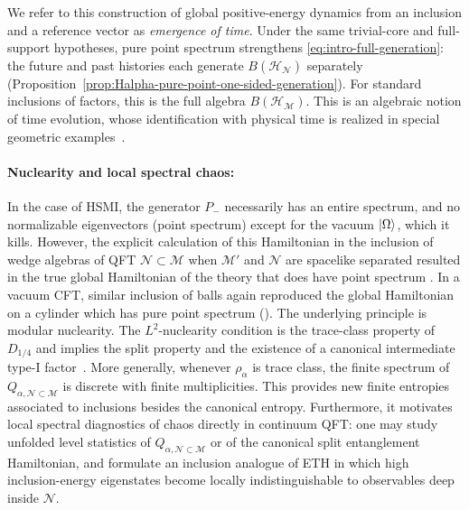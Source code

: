 \documentclass[a4paper,11pt]{article}
\theoremstyle{definition}
\newcommand{\mN}{\mathcal{N}}
\newcommand{\mH}{\mathcal{H}}
\newcommand{\mM}{\mathcal{M}}
\begin{document}
We refer to this construction of global positive-energy dynamics from an inclusion and a reference vector as \emph{emergence of time}. Under the same trivial-core and full-support hypotheses, pure point spectrum strengthens \eqref{eq:intro-full-generation}: the future and past histories each generate $B(\mH_{\mN})$ separately (Proposition~\ref{prop:Halpha-pure-point-one-sided-generation}). For standard inclusions of factors, this is the full algebra $B(\mH_{\mM})$. This is an algebraic notion of time evolution, whose identification with physical time is realized in special geometric examples~\cite{chen2026local}.


 
\paragraph{Nuclearity and local spectral chaos:} In the case of HSMI, the generator $P_-$ necessarily has an entire spectrum, and no normalizable eigenvectors (point spectrum) except for the vacuum $\ket{\Omega}$, which it kills. However, the explicit calculation of this Hamiltonian in the inclusion of wedge algebras of QFT $\mN\subset \mM$ when $\mM'$ and $\mN$ are spacelike separated resulted in the true global Hamiltonian of the theory that does have point spectrum \cite{chen2026local}. In a vacuum CFT, similar inclusion of balls again reproduced the global Hamiltonian on a cylinder which has pure point spectrum (\cite{chen2026local}). The underlying principle is modular nuclearity. The $L^2$-nuclearity condition is the trace-class property of $D_{1/4}$ and implies the split property and the existence of a canonical intermediate type-I factor~\cite{BuchholzDAntoniLongo1990,BDL2007}.  More generally, whenever $\rho_\alpha$ is trace class, the finite spectrum of $Q_{\alpha,\mN\subset\mM}$ is discrete with finite multiplicities. This provides new finite entropies associated to inclusions besides the canonical entropy.
Furthermore, it motivates local spectral diagnostics of chaos directly in continuum QFT: one may study unfolded level statistics of $Q_{\alpha,\mN\subset\mM}$ or of the canonical split entanglement Hamiltonian, and formulate an inclusion analogue of ETH in which high inclusion-energy eigenstates become locally indistinguishable to observables deep inside $\mN$.
\end{document}
